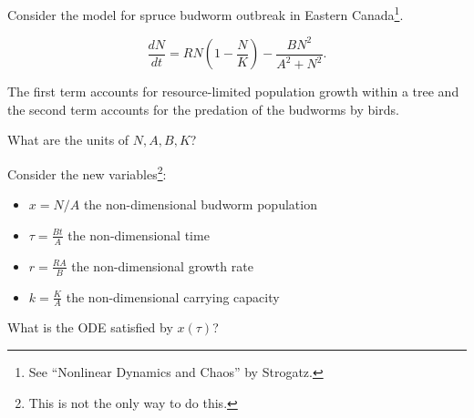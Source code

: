 \documentclass{workbook}
\begin{document}
\begin{slide}
\question \label{q:budworms}
	
Consider the model for spruce budworm outbreak in Eastern Canada\footnote{See ``Nonlinear Dynamics and Chaos'' by Strogatz.}.

\[
\frac{dN}{dt} = R N \left( 1 - \frac{N}{K} \right) - \frac{B N^2}{A^2 + N^2}.
\]

The first term accounts for resource-limited population growth within a tree and the second term accounts for the predation of the budworms by birds.

\begin{parts}
	\item What are the units of $N, A, B, K$?
	\item Consider the new variables\footnote{This is not the only way to do this.}:
	\begin{itemize}
		\item $x = N/A$ the non-dimensional budworm population
		\item $\tau = \frac{Bt}{A}$ the non-dimensional time
		\item $r = \frac{RA}{B}$ the non-dimensional growth rate
		\item $k = \frac{K}{A}$ the non-dimensional carrying capacity
	\end{itemize}
	What is the ODE satisfied by $x(\tau)$?

	
\end{parts}


\end{slide}
\end{document}

